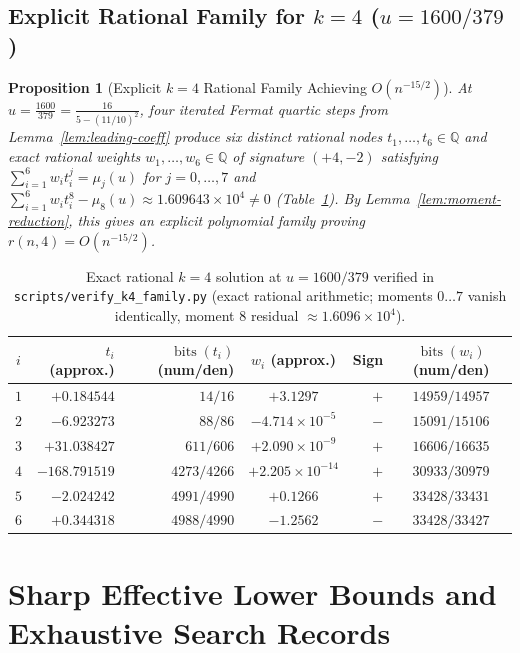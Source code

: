 \documentclass[11pt,a4paper]{article}
\newtheorem{proposition}[theorem]{Proposition}
\theoremstyle{definition}
\theoremstyle{remark}
\newcommand{\QQ}{\mathbb{Q}}
\begin{document}
\subsection{Explicit Rational Family for $k = 4$ ($u = 1600/379$)}

\begin{proposition}[Explicit $k = 4$ Rational Family Achieving $O(n^{-15/2})$]
\label{prop:k4-explicit}
At $u = \frac{1600}{379} = \frac{16}{5 - (11/10)^2}$, four iterated Fermat quartic steps from Lemma~\ref{lem:leading-coeff} produce six distinct rational nodes $t_1, \dots, t_6 \in \QQ$ and exact rational weights $w_1, \dots, w_6 \in \QQ$ of signature $(+4, -2)$ satisfying $\sum_{i=1}^6 w_i t_i^j = \mu_j(u)$ for $j = 0, \dots, 7$ and $\sum_{i=1}^6 w_i t_i^8 - \mu_8(u) \approx 1.609643 \times 10^4 \neq 0$ (Table~\ref{tab:k4-family}). By Lemma~\ref{lem:moment-reduction}, this gives an explicit polynomial family proving $r(n, 4) = O(n^{-15/2})$.
\end{proposition}

\begin{table}[ht]
\centering
\footnotesize
\caption{Exact rational $k = 4$ solution at $u = 1600/379$ verified in \texttt{scripts/verify\_k4\_family.py} (exact rational arithmetic; moments $0 \dots 7$ vanish identically, moment $8$ residual $\approx 1.6096 \times 10^4$).}
\label{tab:k4-family}
\begin{tabular}{@{}crrcrc@{}}
\toprule
$i$ & $t_i$ (approx.) & $\operatorname{bits}(t_i)$ (num/den) & $w_i$ (approx.) & Sign & $\operatorname{bits}(w_i)$ (num/den) \\
\midrule
$1$ & $+0.184544$ & $14 / 16$ & $+3.1297$ & $+$ & $14959 / 14957$ \\
$2$ & $-6.923273$ & $88 / 86$ & $-4.714 \times 10^{-5}$ & $-$ & $15091 / 15106$ \\
$3$ & $+31.038427$ & $611 / 606$ & $+2.090 \times 10^{-9}$ & $+$ & $16606 / 16635$ \\
$4$ & $-168.791519$ & $4273 / 4266$ & $+2.205 \times 10^{-14}$ & $+$ & $30933 / 30979$ \\
$5$ & $-2.024242$ & $4991 / 4990$ & $+0.1266$ & $+$ & $33428 / 33431$ \\
$6$ & $+0.344318$ & $4988 / 4990$ & $-1.2562$ & $-$ & $33428 / 33427$ \\
\bottomrule
\end{tabular}
\end{table}

\section{Sharp Effective Lower Bounds and Exhaustive Search Records}
\label{sec:lower-bounds}
\end{document}
